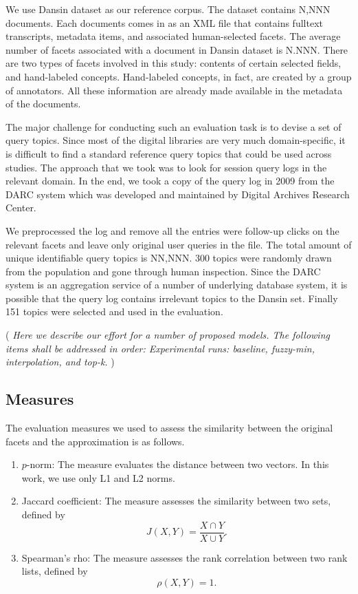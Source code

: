 We use Dansin dataset as our reference corpus.  The dataset contains N,NNN
documents.  Each documents comes in as an XML file that contains fulltext
transcripts, metadata items, and associated human-selected facets.  The average
number of facets associated with a document in Dansin dataset is N.NNN.  There
are two types of facets involved in this study: contents of certain selected
fields, and hand-labeled concepts.  Hand-labeled concepts, in fact, are created
by a group of annotators.  All these information are already made available in
the metadata of the documents.

The major challenge for conducting such an evaluation task is to devise a set
of query topics.  Since most of the digital libraries are very much
domain-specific, it is difficult to find a standard reference query topics that
could be used across studies.  The approach that we took was to look for
session query logs in the relevant domain.  In the end, we took a copy of the
query log in 2009 from the DARC system which was developed and maintained by
Digital Archives Research Center.  

We preprocessed the log and remove all the entries were follow-up clicks on the
relevant facets and leave only original user queries in the file.  The total
amount of unique identifiable query topics is NN,NNN.  300 topics were randomly
drawn from the population and gone through human inspection.  Since the DARC
system is an aggregation service of a number of underlying database system, it
is possible that the query log contains irrelevant topics to the Dansin set.
Finally 151 topics were selected and used in the evaluation.

({ \it Here we describe our effort for a number of proposed models.  The
following items shall be addressed in order: Experimental runs: baseline,
fuzzy-min, interpolation, and top-k.  })

\subsection{Measures}

The evaluation measures we used to assess the similarity between the original
facets and the approximation is as follows.

\begin{enumerate}
\item $p$-norm: The measure evaluates the distance between two vectors.  In this work, we use only L1 and L2 norms.
\item Jaccard coefficient: The measure assesses the similarity between two sets, defined by
\[ J(X,Y) = \frac{X \cap Y}{X \cup Y}. \]
\item Spearman's rho: The measure assesses the rank correlation between two rank lists, defined by
\[ \rho(X,Y) = 1. \]
\end{enumerate}


